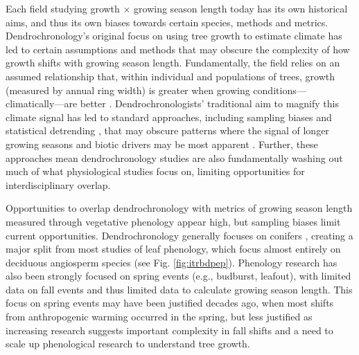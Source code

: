 \documentclass[11pt]{article}
\begin{document}
Each field studying growth $\times$ growing season length today has its own historical aims, and thus its own biases towards certain species, methods and metrics. Dendrochronology's original focus on using tree growth to estimate climate has led to certain assumptions and methods  that may obscure the complexity of how growth shifts with growing season length. Fundamentally, the field relies on an assumed relationship that, within individual and populations of trees, growth (measured by annual ring width) is greater when growing conditions---climatically---are better \citep[e.g.][]{cook2013methods}.  Dendrochronologists' traditional aim to magnify this climate signal has led to standard approaches, including sampling biases \citep[e.g. to `climate-sensitive' individual trees,][]{klesse2018sampling,nehrbass2014influence} and statistical detrending \citep{rollinson2021climate}, that may obscure patterns where the signal of longer growing seasons and biotic drivers may be most apparent \citep[such as rapid growth phases,][]{manzanedo2019towards}.  %
Further, these approaches mean dendrochronology studies are also fundamentally washing out much of what physiological studies focus on, limiting opportunities for interdisciplinary overlap. %

Opportunities to overlap dendrochronology with metrics of growing season length measured through vegetative phenology appear high, but sampling biases limit current opportunities. Dendrochronology generally focuses on conifers \citep[gymnosperms,][]{zhao2019international}, creating a major split from most studies of leaf phenology, which focus almost entirely on deciduous angiosperm species (see Fig. \ref{fig:itrbdpep}). Phenology research has also been strongly focused on spring events (e.g., budburst, leafout), with limited data on fall events and thus limited data to calculate growing season length. This focus on spring events may have been justified decades ago, when most shifts from anthropogenic warming occurred in the spring, but less justified as increasing research suggests important complexity in fall shifts \citep{gill2015,zohner2023effect} and a need to scale up phenological research to understand tree growth.
\end{document}
